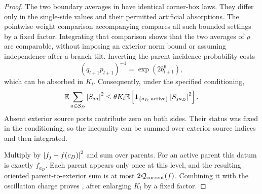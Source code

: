 \begin{proof}
The two boundary averages in
 have identical corner-box
laws.  They differ only in the single-side values and their permitted
artificial absorptions.  The pointwise weight comparison accompanying
 compares all such bounded settings by a fixed
factor.  Integrating that comparison shows that the two averages of
$\rho$ are comparable, without imposing an exterior norm bound or
assuming independence after a branch tilt.  Inverting the parent
incidence probability costs
\[
 (q_{l+1}p_{l+1})^{-1}=\exp(2b_{l+1}^6),
\]
which can be absorbed in $K_l$.  Consequently, under the specified
conditioning,
\begin{equation}
 \mathbb E\sum_{a\in\mathcal S_D}\left\lvert S_{ja}\right\rvert^2
       \le\theta K_l\mathbb E\left[
           \mathbf 1_{\{a_D\text{ active}\}}\left\lvert S_{j a_D}\right\rvert^2\right].
 \label{hier:parent-transfer}
\end{equation}
Absent exterior source ports contribute zero on both sides.  Their
status was fixed in the conditioning, so the inequality can be summed
over exterior source indices and then integrated.

Multiply by $\left\lvert f_j-f(c_D)\right\rvert^2$ and sum over parents.  For an active
parent this datum is exactly $f_{a_D}$.  Each parent appears only once
at this level, and the resulting oriented parent-to-exterior sum is
at most $2\mathcal Q_{\rm current}(f)$.  Combining it with the
oscillation charge proves , after enlarging
$K_l$ by a fixed factor.
\end{proof}

